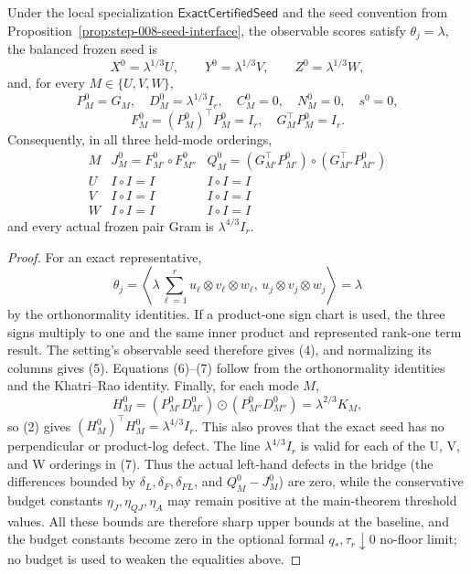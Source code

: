 \begin{lemma}\label{lem:step-013-baseline-geometry}
Under the local
specialization \(\mathsf{ExactCertifiedSeed}\) and the seed convention from Proposition~\ref{prop:step-008-seed-interface}, the
observable scores satisfy \(\theta_j=\lambda\), the balanced frozen seed is
\[
X^0=\lambda^{1/3}U,\qquad Y^0=\lambda^{1/3}V,\qquad
Z^0=\lambda^{1/3}W,
\tag{4}
\]
and, for every \(M\in\{U,V,W\}\),
\[
P_M^0=G_M,\quad D_M^0=\lambda^{1/3}I_r,\quad
C_M^0=0,\quad N_M^0=0,\quad s^0=0,
\tag{5}
\]
\[
F_M^0=(P_M^0)^\top P_M^0=I_r,\quad
G_M^\top P_M^0=I_r.
\tag{6}
\]
Consequently, in all three held-mode orderings,
\[
\begin{array}{c|c|c}
M & J_M^0=F_{M'}^0\circ F_{M''}^0 &
Q_M^0=(G_{M'}^\top P_{M'}^0)\circ(G_{M''}^\top P_{M''}^0)\\ \hline
U & I\circ I=I & I\circ I=I\\
V & I\circ I=I & I\circ I=I\\
W & I\circ I=I & I\circ I=I
\end{array}
\tag{7}
\]
and every actual frozen pair Gram is \(\lambda^{4/3}I_r\).

\begin{proof}
For an exact representative,
\[
\theta_j=\left\langle
\lambda\sum_{\ell=1}^r u_\ell\otimes v_\ell\otimes w_\ell,\,
u_j\otimes v_j\otimes w_j\right\rangle
=\lambda
\tag{8}
\]
by the orthonormality identities. If a product-one sign chart is used, the three signs multiply to
one and the same inner product and represented rank-one term result. The
setting's observable seed therefore gives (4), and normalizing its columns
gives (5). Equations (6)--(7) follow from the orthonormality identities and the Khatri--Rao identity.
Finally, for each mode \(M\),
\[
H_M^0=(P_{M'}^0D_{M'}^0)\odot(P_{M''}^0D_{M''}^0)
=\lambda^{2/3}K_M,
\tag{9}
\]
so (2) gives \((H_M^0)^\top H_M^0=\lambda^{4/3}I_r\). This also proves
that the exact seed has no perpendicular or product-log defect. The line
\(\lambda^{4/3}I_r\) is valid for each of the U, V, and W orderings in (7).
Thus the actual left-hand defects in the bridge (the differences bounded by
\(\delta_L,\delta_F,\delta_{FL}\), and \(Q_M^0-J_M^0\)) are zero, while the
conservative budget constants \(\eta_J,\eta_{QJ},\eta_A\) may remain positive
at the main-theorem threshold values. All these bounds are therefore sharp
upper bounds at the baseline, and the budget constants become zero in the
optional formal \(q_*,\tau_r\downarrow0\) no-floor limit; no budget is used
to weaken the equalities above.



\end{proof}
\end{lemma}
